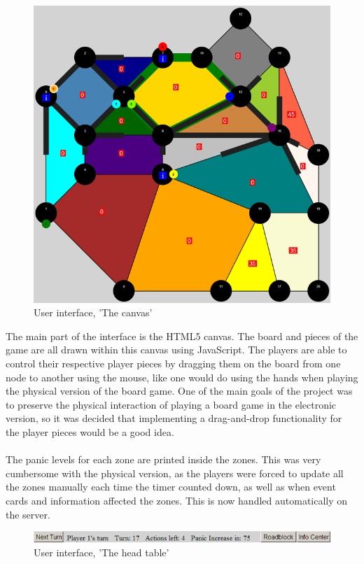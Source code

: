 \begin{figure}[H]
  \centering
    \includegraphics[width=1.0\textwidth]{img/canvas.png}
  \caption{User interface, 'The canvas'} 
  \label{fig:canvas}
\end{figure}


The main part of the interface is the HTML5 canvas. The board and pieces of the game are all drawn within this canvas using JavaScript. The players are able to control their respective player pieces by dragging them on the board from one node to another using the mouse, like one would do using the hands when playing the physical version of the board game. One of the main goals of the project was to preserve the physical interaction of playing a board game in the electronic version, so it was decided that implementing a drag-and-drop functionality for the player pieces would be a good idea. \\
\\
The panic levels for each zone are printed inside the zones. This was very cumbersome with the physical version, as the players were forced to update all the zones manually each time the timer counted down, as well as when event cards and information affected the zones. This is now handled automatically on the server. \\


\begin{figure}[H]
  \centering
    \includegraphics[width=1.0\textwidth]{img/headtable.png}
  \caption{User interface, 'The head table'} 
  \label{fig:headtable}
\end{figure}

